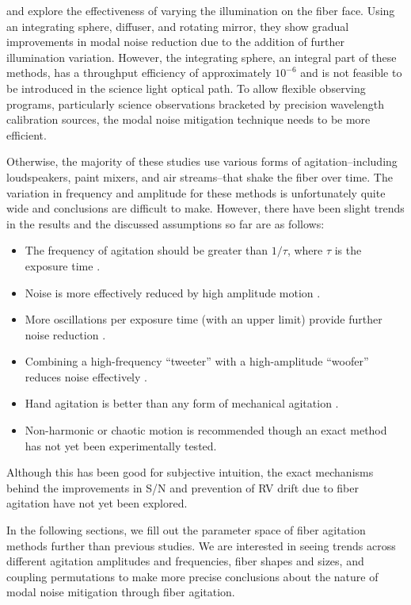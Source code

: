 \documentclass[twocolumn]{emulateapj}
\begin{document}
\citet{Mahadevan2014} and \citet{Halverson2014} explore the effectiveness of varying the illumination on the fiber face. Using an integrating sphere, diffuser, and rotating mirror, they show gradual improvements in modal noise reduction due to the addition of further illumination variation. However, the integrating sphere, an integral part of these methods, has a throughput efficiency of approximately $10^{-6}$ and is not feasible to be introduced in the science light optical path. To allow flexible observing programs, particularly science observations bracketed by precision wavelength calibration sources, the modal noise mitigation technique needs to be more efficient.

Otherwise, the majority of these studies use various forms of agitation--including loudspeakers, paint mixers, and air streams--that shake the fiber over time. The variation in frequency and amplitude for these methods is unfortunately quite wide and conclusions are difficult to make. However, there have been slight trends in the results and the discussed assumptions so far are as follows:
\begin{itemize}
\item The frequency of agitation should be greater than $1/\tau$, where $\tau$ is the exposure time \citep{Baudrand2001}.
\item Noise is more effectively reduced by high amplitude motion \citep{Lemke2011, McCoy2012}.
\item More oscillations per exposure time (with an upper limit) provide further noise reduction \citep{Lemke2011}.
\item Combining a high-frequency ``tweeter'' with a high-amplitude ``woofer'' reduces noise effectively \citep{Plavchan2013}.
\item Hand agitation is better than any form of mechanical agitation \citep{Lemke2011, McCoy2012, Mahadevan2014, Roy2014}.
\item Non-harmonic or chaotic motion is recommended \citep{Grupp2003} though an exact method has not yet been experimentally tested.
\end{itemize}
Although this has been good for subjective intuition, the exact mechanisms behind the improvements in S/N and prevention of RV drift due to fiber agitation have not yet been explored.

In the following sections, we fill out the parameter space of fiber agitation methods further than previous studies. We are interested in seeing trends across different agitation amplitudes and frequencies, fiber shapes and sizes, and coupling permutations to make more precise conclusions about the nature of modal noise mitigation through fiber agitation.
\end{document}
